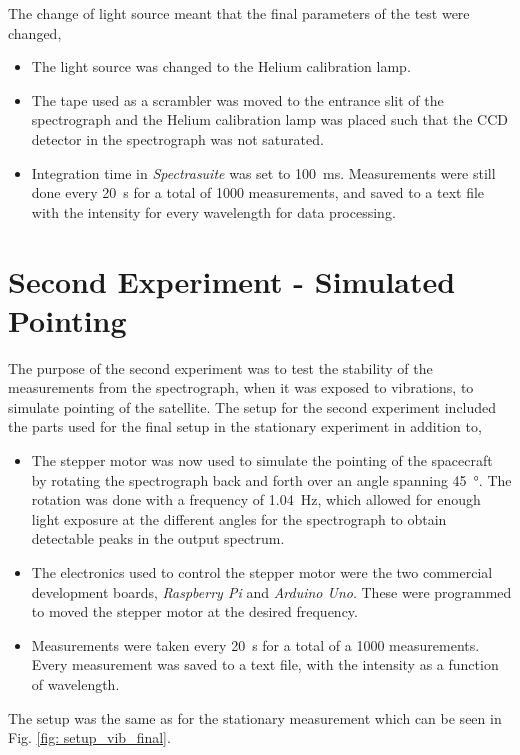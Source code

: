 The change of light source meant that the final parameters of the test were changed,
\begin{itemize}
\item The light source was changed to the Helium calibration lamp. 
\item The tape used as a scrambler was moved to the entrance slit of the spectrograph and the Helium calibration lamp was placed such that the CCD detector in the spectrograph was not saturated.
\item Integration time in \emph{Spectrasuite} was set to \SI{100}{\milli\second}. Measurements were still done every \SI{20}{\second} for a total of \num{1000} measurements, and saved to a text file with the intensity for every wavelength for data processing.
\end{itemize}

\section{Second Experiment - Simulated Pointing}
The purpose of the second experiment was to test the stability of the measurements from the spectrograph, when it was exposed to vibrations, to simulate pointing of the satellite. The setup for the second experiment included the parts used for the final setup in the stationary experiment in addition to,
\begin{itemize}
\item The stepper motor was now used to simulate the pointing of the spacecraft by rotating the spectrograph back and forth over an angle spanning \SI{45}{\degree}. The rotation was done with a frequency of \SI{1.04}{\Hz}, which allowed for enough light exposure at the different angles for the spectrograph to obtain detectable peaks in the output spectrum. 
\item The electronics used to control the stepper motor were the two commercial development boards, \emph{Raspberry Pi} and \emph{Arduino Uno}. These were programmed to moved the stepper motor at the desired frequency.
\item Measurements were taken every \SI{20}{\second} for a total of a \num{1000} measurements. Every measurement was saved to a text file, with the intensity as a function of wavelength.
\end{itemize}

The setup was the same as for the stationary measurement which can be seen in Fig. \ref{fig: setup_vib_final}.

